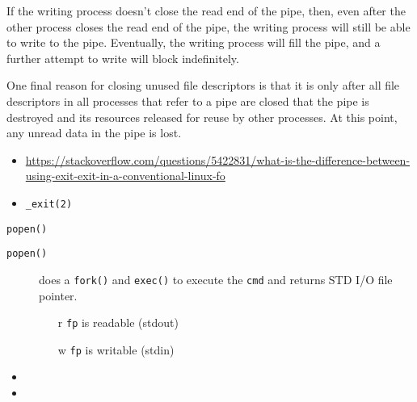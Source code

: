\begin{itemize}
  If the writing process doesn't close the read end of the pipe, then, even after the
  other process closes the read end of the pipe, the writing process will still be able to
  write to the pipe. Eventually, the writing process will fill the pipe, and a further
  attempt to write will block indefinitely.

  One final reason for closing unused file descriptors is that it is only after all file
  descriptors in all processes that refer to a pipe are closed that the pipe is destroyed
  and its resources released for reuse by other processes. At this point, any unread data
  in the pipe is lost.
\end{itemize}

\begin{frame}
  \begin{center}
  \end{center}
\end{frame}

\begin{itemize}
\item
  \url{https://stackoverflow.com/questions/5422831/what-is-the-difference-between-using-exit-exit-in-a-conventional-linux-fo}
\item \texttt{\_exit(2)}
\end{itemize}

\begin{frame}{\texttt{popen()}}
\begin{center}
\end{center}
\begin{description}
\item[\texttt{popen()}] does a \texttt{fork()} and \texttt{exec()} to execute the
  \texttt{cmd} and returns STD I/O file pointer.
  \begin{itemize}
  \item[r] \texttt{fp} is readable (stdout)
  \item[w] \texttt{fp} is writable (stdin)
  \end{itemize}
\end{description}
\end{frame}

\begin{itemize}
\item {}
\item {}
\end{itemize}

